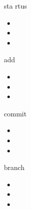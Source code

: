 \documentclass[aspectratio=1610,20pt,xcolor=pdftex,dvipsnames,table,handout]{beamer}
\begin{document}
		\begin{frame} [t,plain]									
											
			\begin{block} {		sta rtus		}				
			\setlength{\leftmargini}{1em}								
			\begin{itemize}								
				\item							
				\item							
				\item							
			\end{itemize}								
			\end{block}								
											
		\end{frame}									

		\begin{frame} [t,plain]									
											
			\begin{block} {		add		}				
			\setlength{\leftmargini}{1em}								
			\begin{itemize}								
				\item							
				\item							
				\item							
			\end{itemize}								
			\end{block}								
											
		\end{frame}									


		\begin{frame} [t,plain]									
											
			\begin{block} {		commit		}				
			\setlength{\leftmargini}{1em}								
			\begin{itemize}								
				\item							
				\item							
				\item							
			\end{itemize}								
			\end{block}								
											
		\end{frame}									

		\begin{frame} [t,plain]									
											
			\begin{block} {		branch		}				
			\setlength{\leftmargini}{1em}								
			\begin{itemize}								
				\item							
				\item							
				\item							
			\end{itemize}								
			\end{block}								
											
		\end{frame}									
\end{document}
